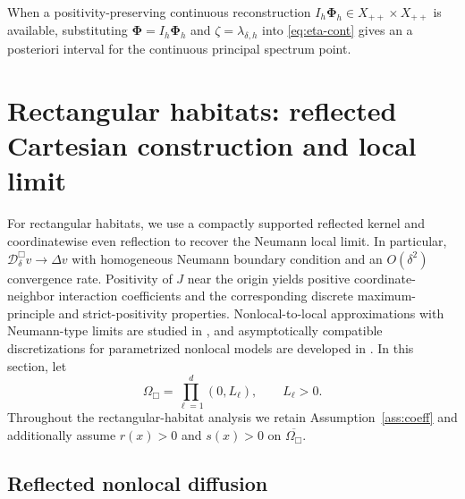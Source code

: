 \documentclass[11pt]{article}
\theoremstyle{definition}
\newcommand{\PhiV}{\bm\Phi}
\begin{document}
When a positivity-preserving continuous reconstruction
$I_h\PhiV_h\in X_{++}\times X_{++}$ is available, substituting
$\PhiV=I_h\PhiV_h$ and $\zeta=\lambda_{\delta,h}$ into
\eqref{eq:eta-cont} gives an a posteriori interval for the continuous
principal spectrum point.


\section{Rectangular habitats: reflected Cartesian construction and local limit}
\label{sec:cartesian}
For rectangular habitats, we use a compactly supported reflected kernel and coordinatewise even reflection to recover the Neumann local limit.  In particular, $\mathcal D_\delta^{\Box}v\to\Delta v$ with homogeneous Neumann boundary condition and an $O(\delta^2)$ convergence rate.  Positivity of $J$ near the origin yields positive coordinate-neighbor interaction coefficients and the corresponding discrete maximum-principle and strict-positivity properties.  Nonlocal-to-local approximations with Neumann-type limits are studied in \cite{Cortazar2008,ShenXie2015}, and asymptotically compatible discretizations for parametrized nonlocal models are developed in \cite{TianDu2014,TianDu2020}.  In this section, let
\begin{equation}
\label{eq:box-domain}
 \Omega_{\Box}
 =
 \prod_{\ell=1}^{d}(0,L_{\ell}),
 \qquad L_\ell>0.
\end{equation}
Throughout the rectangular-habitat analysis we retain
Assumption~\ref{ass:coeff} and additionally assume $r(x)>0$ and $s(x)>0$ on $\overline{\Omega_{\Box}}$.

\subsection{Reflected nonlocal diffusion}
\end{document}

